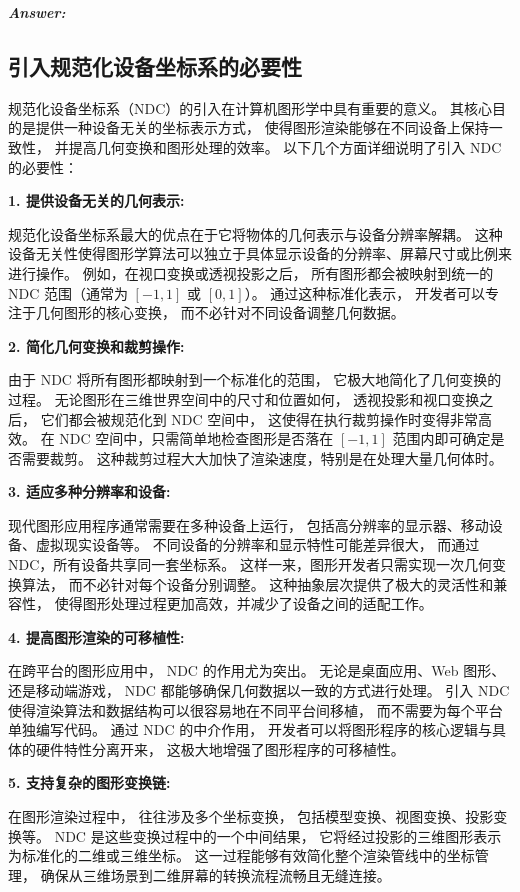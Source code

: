 \documentclass[12pt]{article}
\newenvironment{Answer}{
  \vspace{12pt}
  {\large\textbf{\textit{\hspace{-12pt}Answer:}}}\par
  \vspace{8pt}
} {\vspace{24pt}}
\begin{document}
\begin{Answer}
\subsection*{引入规范化设备坐标系的必要性}
\noindent

规范化设备坐标系（NDC）的引入在计算机图形学中具有重要的意义。
其核心目的是提供一种设备无关的坐标表示方式，
使得图形渲染能够在不同设备上保持一致性，
并提高几何变换和图形处理的效率。
以下几个方面详细说明了引入 NDC 的必要性：

\noindent\textbf{1. 提供设备无关的几何表示:}

规范化设备坐标系最大的优点在于它将物体的几何表示与设备分辨率解耦。
这种设备无关性使得图形学算法可以独立于具体显示设备的分辨率、屏幕尺寸或比例来进行操作。
例如，在视口变换或透视投影之后，
所有图形都会被映射到统一的 NDC 范围（通常为 $[-1, 1]$ 或 $[0, 1]$）。
通过这种标准化表示，
开发者可以专注于几何图形的核心变换，
而不必针对不同设备调整几何数据。

\noindent\textbf{2. 简化几何变换和裁剪操作:}

由于 NDC 将所有图形都映射到一个标准化的范围，
它极大地简化了几何变换的过程。
无论图形在三维世界空间中的尺寸和位置如何，
透视投影和视口变换之后，
它们都会被规范化到 NDC 空间中，
这使得在执行裁剪操作时变得非常高效。
在 NDC 空间中，只需简单地检查图形是否落在 $[-1, 1]$ 范围内即可确定是否需要裁剪。
这种裁剪过程大大加快了渲染速度，特别是在处理大量几何体时。

\noindent\textbf{3. 适应多种分辨率和设备:}

现代图形应用程序通常需要在多种设备上运行，
包括高分辨率的显示器、移动设备、虚拟现实设备等。
不同设备的分辨率和显示特性可能差异很大，
而通过 NDC，所有设备共享同一套坐标系。
这样一来，图形开发者只需实现一次几何变换算法，
而不必针对每个设备分别调整。
这种抽象层次提供了极大的灵活性和兼容性，
使得图形处理过程更加高效，并减少了设备之间的适配工作。

\noindent\textbf{4. 提高图形渲染的可移植性:}

在跨平台的图形应用中，
NDC 的作用尤为突出。
无论是桌面应用、Web 图形、还是移动端游戏，
NDC 都能够确保几何数据以一致的方式进行处理。
引入 NDC 使得渲染算法和数据结构可以很容易地在不同平台间移植，
而不需要为每个平台单独编写代码。
通过 NDC 的中介作用，
开发者可以将图形程序的核心逻辑与具体的硬件特性分离开来，
这极大地增强了图形程序的可移植性。

\noindent\textbf{5. 支持复杂的图形变换链:}

在图形渲染过程中，
往往涉及多个坐标变换，
包括模型变换、视图变换、投影变换等。
NDC 是这些变换过程中的一个中间结果，
它将经过投影的三维图形表示为标准化的二维或三维坐标。
这一过程能够有效简化整个渲染管线中的坐标管理，
确保从三维场景到二维屏幕的转换流程流畅且无缝连接。


\end{Answer}
\end{document}
